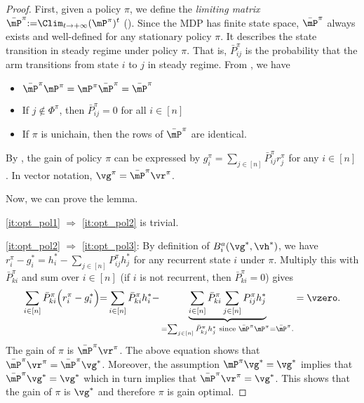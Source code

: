 \begin{proof}
    First, given a policy $\pi$, we define the \emph{limiting matrix} $\bar{\mP}^\pi{:=}\displaystyle\Clim_{t\to+\infty}{(\mP^\pi)^t}$ (\cite[Appendix~A.4]{puterman2014markov}). %
    Since the MDP has finite state space, $\bar{\mP}^\pi$ always exists and well-defined for any stationary policy $\pi$.
    It describes the state transition in steady regime under policy $\pi$.
    That is, $\bar{P}^\pi_{ij}$ is the probability that the arm transitions from state $i$ to $j$ in steady regime.
    From \cite[Section~A.4]{puterman2014markov}, we have
    \begin{itemize}
        \item $\bar{\mP}^\pi\mP^\pi =\mP^\pi\bar{\mP}^\pi =\bar{\mP}^\pi$
        \item If $j\notin\Phi^\pi$, then $\bar{P}^\pi_{ij}=0$ for all $i\in[n]$
        \item If $\pi$ is unichain, then the rows of $\bar{\mP}^\pi$ are identical.
    \end{itemize}
    By \cite[Theorem~8.2.6]{puterman2014markov}, the gain of policy $\pi$ can be expressed by $g^\pi_i=\sum_{j\in[n]}\bar{P}^\pi_{ij}r^{\pi}_j$ for any $i\in[n]$.
    In vector notation, $\vg^\pi=\bar{\mP}^\pi\vr^\pi$.

    Now, we can prove the lemma.

    \ref{it:opt_pol1} $\Rightarrow$ \ref{it:opt_pol2} is trivial.

    \ref{it:opt_pol2} $\Rightarrow$ \ref{it:opt_pol3}: By definition of $B_i^a(\vg^*,\vh^*)$, we have $r^{\pi}_i-g^*_i = h^*_i-\sum_{j\in[n]} P^{\pi}_{ij}h^*_j$ for any recurrent state $i$ under $\pi$.
    Multiply this with $\bar{P}^\pi_{ki}$ and sum over $i\in[n]$ (if $i$ is not recurrent, then $\bar{P}^\pi_{ki}=0$) gives
    \begin{align*}
        \sum_{i\in[n]} \bar{P}^\pi_{ki}\Big(r^{\pi}_i-g^*_i\Big) {=} \sum_{i\in[n]} \bar{P}^\pi_{ki}h^*_i {-} \underbrace{\sum_{i\in[n]} \bar{P}^\pi_{ki}\sum_{j\in[n]} P^{\pi}_{ij}h^*_j}_{=\sum_{j\in[n]} \bar{P}^\pi_{kj}h^*_j \text{ since $\bar{\mP}^\pi\mP^\pi{=}\bar{\mP}^\pi$.}}
        = \vzero.
    \end{align*}
    The gain of $\pi$ is $\bar{\mP}^\pi \vr^\pi$.
    The above equation shows that $\bar{\mP}^\pi\vr^\pi = \bar{\mP}^\pi\vg^*$. Moreover, the assumption  $\mP^\pi\vg^*=\vg^*$ implies that $\bar{\mP}^\pi\vg^*=\vg^*$ which in turn implies that $\bar{\mP}^\pi\vr^\pi=\vg^*$. This shows that the gain of $\pi$ is $\vg^*$ and therefore $\pi$ is gain optimal.


\end{proof}
